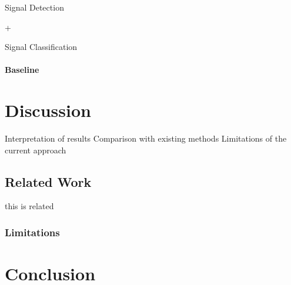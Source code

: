 \documentclass[english, ing, kiv, he, iso690alph, pdf, viewonly]{fasthesis}
\begin{document}
Signal Detection


+


Signal Classification


\subsubsection{Baseline}


\chapter{Discussion}

Interpretation of results
Comparison with existing methods
Limitations of the current approach


\section{Related Work}
this is related\cite{Staino2022}
\subsection{Limitations}


\chapter{Conclusion}






\end{document}
